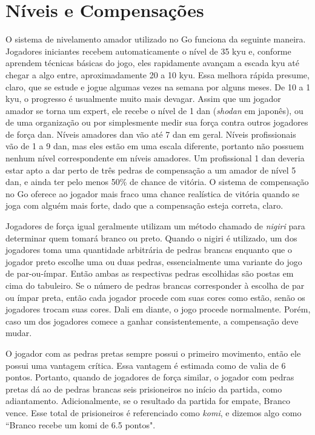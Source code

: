 \chapter{Níveis e Compensações}

O sistema de nivelamento amador utilizado no Go funciona da seguinte maneira. Jogadores iniciantes recebem automaticamente o nível de 35 kyu e, conforme aprendem técnicas básicas do jogo, eles rapidamente avançam a escada kyu até chegar a algo entre, aproximadamente 20 a 10 kyu. Essa melhora rápida presume, claro, que se estude e jogue algumas vezes na semana por alguns meses. De 10 a 1 kyu, o progresso é usualmente muito mais devagar. Assim que um jogador amador se torna um expert, ele recebe o nível de 1 dan (\emph{shodan} em japonês), ou de uma organização ou por simplesmente medir sua força contra outros jogadores de força dan. Níveis amadores dan vão até 7 dan em geral. Níveis profissionais vão de 1 a 9 dan, mas eles estão em uma escala diferente, portanto não possuem nenhum nível correspondente em níveis amadores. Um profissional 1 dan deveria estar apto a dar perto de três pedras de compensação a um amador de nível 5 dan, e ainda ter pelo menos 50\% de chance de vitória. O sistema de compensação no Go oferece ao jogador mais fraco uma chance realística de vitória quando se joga com alguém mais forte, dado que a compensação esteja correta, claro.

Jogadores de força igual geralmente utilizam um método chamado de \emph{nigiri} para determinar quem tomará branco ou preto. Quando o nigiri é utilizado, um dos jogadores toma uma quantidade arbitrária de pedras brancas enquanto que o jogador preto escolhe uma ou duas pedras, essencialmente uma variante do jogo de par-ou-ímpar. Então ambas as respectivas pedras escolhidas são postas em cima do tabuleiro. Se o número de pedras brancas corresponder à escolha de par ou ímpar preta, então cada jogador procede com suas cores como estão, senão os jogadores trocam suas cores. Dali em diante, o jogo procede normalmente. Porém, caso um dos jogadores comece a ganhar consistentemente, a compensação deve mudar.

O jogador com as pedras pretas sempre possui o primeiro movimento, então ele possui uma vantagem crítica. Essa vantagem é estimada como de valia de 6 pontos. Portanto, quando de jogadores de força similar, o jogador com pedras pretas dá ao de pedras brancas seis prisioneiros no início da partida, como adiantamento. Adicionalmente, se o resultado da partida for empate, Branco vence. Esse total de prisioneiros é referenciado como \emph{komi}, e dizemos algo como ``Branco recebe um komi de 6.5 pontos".

